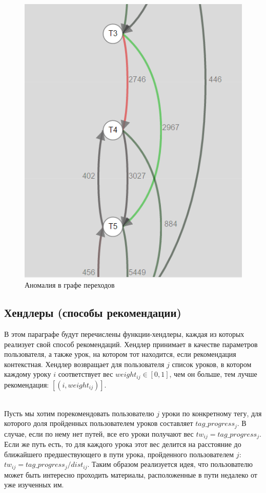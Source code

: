 \documentclass[14pt]{matmex-diploma}
\begin{document}
\begin{figure}[t]
\centering
\includegraphics[width=0.45\linewidth]{images/PM_anomaly.PNG}
\caption{Аномалия в графе переходов}
\label{fig:processmap}
\end{figure}


\subsection{Хендлеры (способы рекомендации)}
\indent В этом параграфе будут перечислены функции-хендлеры, каждая из которых реализует свой способ рекомендаций. Хендлер принимает в качестве параметров пользователя, а также урок, на котором тот находится, если рекомендация контекстная. Хендлер возвращает для пользователя $j$ список уроков, в котором каждому уроку $i$ соответствует вес $weight_{ij} \in [0,1]$, чем он больше, тем лучше рекомендация:  $[(i, weight_{ij})]$. 

\\\indent Пусть мы хотим порекомендовать пользователю $j$ уроки по конкретному тегу, для которого доля пройденных пользователем уроков составляет $tag\_progress_j$. В случае, если по нему нет путей, все его уроки получают вес  $tw_{ij} =tag\_progress_j$. Если же путь есть, то для каждого урока этот вес делится на расстояние до ближайшего предшествующего в пути урока, пройденного пользователем $j$: $tw_{ij} = tag\_progress_j / dist_{ij}$. Таким образом реализуется идея, что пользователю может быть интересно проходить материалы, расположенные в пути недалеко от уже изученных им.
\end{document}
